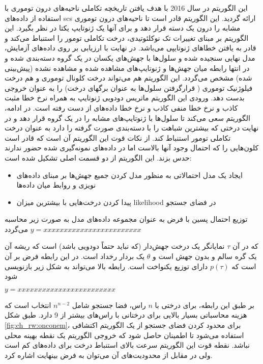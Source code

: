 این الگوریتم در سال 2016 با هدف یافتن تاریخچه تکاملی ناحیه‌های درون توموری با استفاده از داده‌های \gls{scs} ارائه گردید. این الگوریتم قادر است تا ناحیه‌های درون توموری مشابه را درون یک دسته قرار دهد و برای آنها یک ژنوتایپ یکتا در نظر بگیرد. این الگوریتم بر مبنای تغییرات تک نوکلئوتیدی، درخت تکاملی تومور را استنباط می‌کند و قادر به یافتن خطاهای ژنوتایپی می‌باشد. در نهایت با ارزیابی بر روی داده‌های آزمایش، مدل نهایی سنجیده شده و سلول‌ها با جهش‌های یکسان در یک گروه دسته‌بندی شده و در انتها رابطه میان جهش‌ها و ژنوتایپ‌های مشاهده شده و مشاهده نشده (پیش‌بینی شده) مشخص می‌گردد. این الگوریتم هم می‌تواند درخت کلونال توموری و هم درخت فیلوژنیک توموری ( قرارگرفتن سلول‌ها به عنوان برگهای درخت) را به عنوان خروجی بدست دهد. ورودی این الگوریتم ماتریس دودویی ژنوتایپ به همراه نرخ خطا مثبت کاذب و نرخ خطا منفی کاذب و نرخ خطا داده‌های از دست رفته است. در ادامه، الگوریتم سعی می‌کند تا سلول‌ها با ژنوتایپ‌های مشابه را در یک گروه قرار دهد و در نهایت درختی که بیشترین شباهت را با دسته‌بندی صورت گرفته را دارد به عنوان درخت تکاملی تومور استنباط کند. از نکات قوت این الگوریتم آن است که قادر است کلون‌هایی را که احتمال وجود آنها بالاست اما در داده‌های نمونه‌گیری شده حضور ندارند حدس بزند. این الگوریتم از دو قسمت اصلی تشکیل شده است: 
\begin{itemize}
	\item ایجاد یک مدل احتمالاتی به منظور مدل کردن جمیع جهش‌ها بر مبنای داده‌های نویزی و روابط میان داده‌ها 
	\item پیدا کردن درخت‌هایی با بیشترین میزان \gls{likelihood} در فضای جستجو 
\end{itemize}
توزیع احتمال پسین با فرض  به عنوان مجموعه داده‌های مدل به صورت زیر محاسبه می‌گردد
\begin{math}
	y=xxxxxxxxxxxxxxxxxxxxxxxx
\end{math}

که در آن $\tau$ نمایانگر یک درخت جهش‌دار (که نباید حتماً دودویی باشد) است که ریشه آن یک گره سالم و بدون جهش است و $\theta$ یک بردار رخداد است. در این رابطه فرض بر آن است که $p(\tau)$ دارای توزیع یکنواخت است. رابطه بالا می‌تواند به شکل زیر بازنویسی شود

\begin{math}
	y=xxxxxxxxxxxxxxxxxxxxxxxx
\end{math}

بر طبق این رابطه، برای درختی با  $n$ راس، فضا جستجو شامل $n^{n-2}$  انتخاب است که هزینه محاسباتی بسیار بالایی برای درختانی با راس‌های بیشتر از 9 دارد. طبق شکل \ref{fig:ch_rw:onconem}، برای محدود کردن فضای جستجو از یک الگوریتم اکتشافی استفاده می‌شود تا اطمینان حاصل شود که خروجی الگوریتم یک نقطه بهینه محلی نباشد. نقطه قوت این الگوریتم سرعت بالای استنباط درخت برای داده‌های کم است ولی در مقابل از محدودیت‌های آن می‌توان به فرض بینهایت اشاره کرد.

